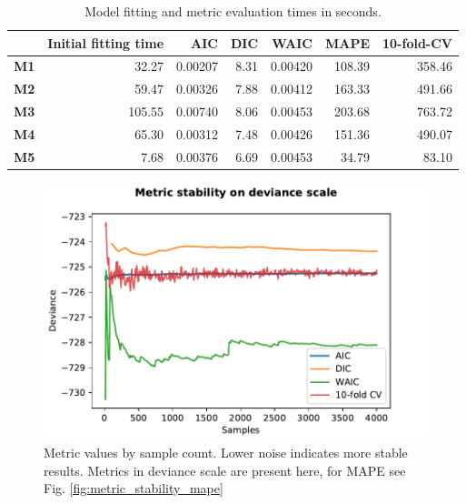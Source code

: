 \documentclass[english, 12pt, a4paper, sci, utf8, a-1b, online]{aaltothesis}
\begin{document}
\begin{abstractpage}[english]
\begin{table}[htb]
	\centering
	\caption{Model fitting and metric evaluation times in seconds.}
	\label{tab:times}
	\begin{tabular}{|r|r|r|r|r|r|r|}
	\hline
	\textbf{}   & \textbf{Initial fitting time} & \textbf{AIC} & \textbf{DIC} & \textbf{WAIC} & \textbf{MAPE} & \textbf{10-fold-CV} \\ \hline
	\textbf{M1} & 32.27                         & 0.00207      & 8.31         & 0.00420       & 108.39        & 358.46              \\ \hline
	\textbf{M2} & 59.47                         & 0.00326      & 7.88         & 0.00412       & 163.33        & 491.66              \\ \hline
	\textbf{M3} & 105.55                        & 0.00740      & 8.06         & 0.00453       & 203.68        & 763.72              \\ \hline
	\textbf{M4} & 65.30                         & 0.00312      & 7.48         & 0.00426       & 151.36        & 490.07              \\ \hline
	\textbf{M5} & 7.68                          & 0.00376      & 6.69         & 0.00453       & 34.79         & 83.10               \\ \hline
	\end{tabular}
\end{table}

\begin{figure}[hbt]
	\centering
	\includegraphics{../plots/stability/metric_stability.pdf}
	\caption{\label{fig:metric_stability_deviance}Metric values by sample count. Lower noise indicates more stable results. Metrics in deviance scale are present here, for MAPE see Fig. \ref{fig:metric_stability_mape}}
\end{figure}


\end{abstractpage}
\end{document}
